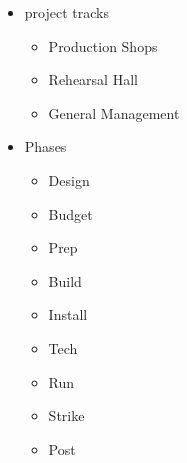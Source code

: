 \documentclass[12pt]{article}
\begin{document}
\begin{itemize}
\begin{itemize}
                    \item project tracks
                    \begin{itemize}
                        \item Production Shops
                        \item Rehearsal Hall
                        \item General Management
                    \end{itemize}
                    \item Phases
                    \begin{itemize}
                        \item Design
                        \item Budget
                        \item Prep
                        \item Build
                        \item Install
                        \item Tech
                        \item Run
                        \item Strike
                        \item Post
                    \end{itemize}
                \end{itemize}
            \end{itemize}
            \newpage
\end{document}
